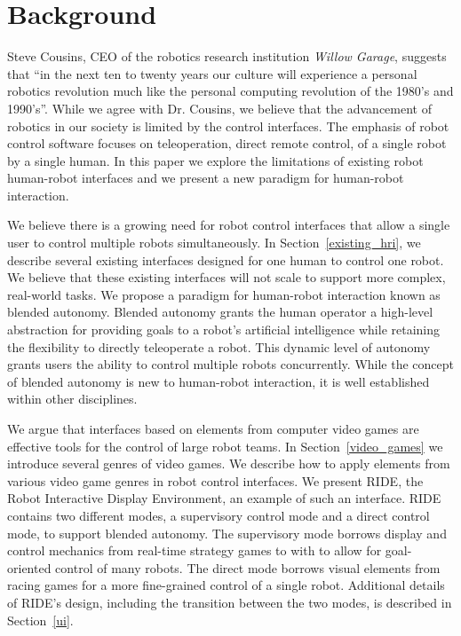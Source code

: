 \chapter{Background}
Steve Cousins, CEO of the robotics research institution \emph{Willow Garage}, suggests that ``in the next ten to twenty years our culture will experience a personal robotics revolution much like the personal computing revolution of the 1980's and 1990's''. \cite{Cousins} While we agree with Dr. Cousins, we believe that the advancement of robotics in our society is limited by the control interfaces. The emphasis of robot control software focuses on teleoperation, direct remote control, of a single robot by a single human. In this paper we explore the limitations of existing robot human-robot interfaces and we present a new paradigm for human-robot interaction.

We believe there is a growing need for robot control interfaces that allow a single user to control multiple robots simultaneously. In Section~\ref{existing_hri}, we describe several existing interfaces designed for one human to control one robot. We believe that these existing interfaces will not scale to support more complex, real-world tasks. We propose a paradigm for human-robot interaction known as blended autonomy. Blended autonomy grants the human operator a high-level abstraction for providing goals to a robot's artificial intelligence while retaining the flexibility to directly teleoperate a robot. This dynamic level of autonomy grants users the ability to control multiple robots concurrently. While the concept of blended autonomy is new to human-robot interaction, it is well established within other disciplines.

We argue that interfaces based on elements from computer video games are effective tools for the control of large robot teams. In Section~\ref{video_games} we introduce several genres of video games. We describe how to apply elements from various video game genres in robot control interfaces. We present RIDE, the Robot Interactive Display Environment, an example of such an interface. RIDE contains two different modes, a supervisory control mode and a direct control mode, to support blended autonomy. The supervisory mode borrows display and control mechanics from real-time strategy games to with to allow for goal-oriented control of many robots. The direct mode borrows visual elements from racing games for a more fine-grained control of a single robot. Additional details of RIDE's design, including the transition between the two modes, is described in Section~\ref{ui}.

